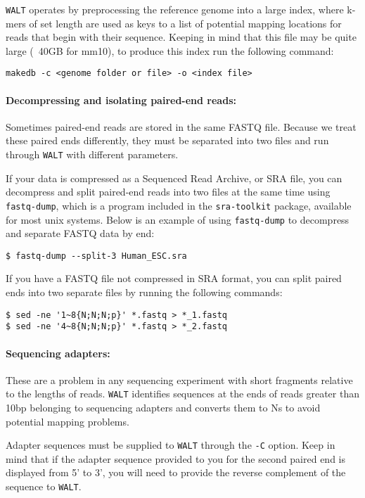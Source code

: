 \documentclass[10pt]{article}
\newcommand{\prog}[1]{\texttt{#1}}
\newcommand{\op}[1]{\texttt{#1}}
\begin{document}
\prog{WALT} operates by preprocessing the reference genome into a large
index, where k-mers of set length are used as keys to a list of potential
mapping locations for reads that begin with their sequence. Keeping in
mind that this file may be quite large (~40GB for mm10), to produce
this index run the following command:

\begin{verbatim}
makedb -c <genome folder or file> -o <index file>
\end{verbatim}

\paragraph{Decompressing and isolating paired-end reads:}
Sometimes paired-end reads are stored in the same FASTQ file.  Because
we treat these paired ends differently, they must be separated into
two files and run through \prog{WALT} with different parameters.

If your data is compressed as a Sequenced Read Archive, or SRA file, you can
decompress and split paired-end reads into two files at the same time using
\prog{fastq-dump}, which is a program included in the \prog{sra-toolkit} 
package, available for most unix systems.  Below is an example of using
\prog{fastq-dump} to decompress and separate FASTQ data by end:
\begin{verbatim}
$ fastq-dump --split-3 Human_ESC.sra
\end{verbatim}

If you have a FASTQ file not compressed in SRA format, you can split paired
ends into two separate files by running the following commands:
\begin{verbatim}
$ sed -ne '1~8{N;N;N;p}' *.fastq > *_1.fastq
$ sed -ne '4~8{N;N;N;p}' *.fastq > *_2.fastq
\end{verbatim}

\paragraph{Sequencing adapters:}

These are a problem in any sequencing experiment with short fragments
relative to the lengths of reads.  \prog{WALT} identifies sequences at the
ends of reads greater than 10bp belonging to sequencing adapters and
converts them to Ns to avoid potential mapping problems.

Adapter sequences must be supplied to \prog{WALT} through the \op{-C}
option.  Keep in mind that if the adapter sequence provided to you for
the second paired end is displayed from 5' to 3', you will need to
provide the reverse complement of the sequence to \prog{WALT}.
\end{document}
